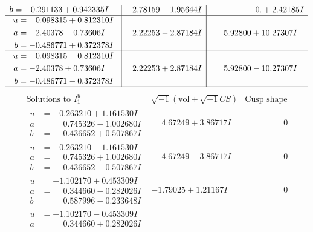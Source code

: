 \documentclass[1p]{elsarticle_modified}
\theoremstyle{definition}
\newcommand{\I}{\sqrt{-1}}
\begin{document}
$$\begin{array}{c|c|c}
\begin{aligned}
b &= -0.291133 + 0.942335 I\end{aligned}
 & -2.78159 - 1.95644 I & \phantom{-0.000000 -}0. + 2.42185 I \\ \hline\begin{aligned}
u &= \phantom{-}0.098315 + 0.812310 I \\
a &= -2.40378 - 0.73606 I \\
b &= -0.486771 + 0.372378 I\end{aligned}
 & \phantom{-}2.22253 - 2.87184 I & \phantom{-}5.92800 + 10.27307 I \\ \hline\begin{aligned}
u &= \phantom{-}0.098315 - 0.812310 I \\
a &= -2.40378 + 0.73606 I \\
b &= -0.486771 - 0.372378 I\end{aligned}
 & \phantom{-}2.22253 + 2.87184 I & \phantom{-}5.92800 - 10.27307 I\\
 \hline 
 \end{array}$$\newpage$$\begin{array}{c|c|c}  
\text{Solutions to }I^u_{1}& \I (\text{vol} + \sqrt{-1}CS) & \text{Cusp shape}\\
 \hline 
\begin{aligned}
u &= -0.263210 + 1.161530 I \\
a &= \phantom{-}0.745326 - 1.002680 I \\
b &= \phantom{-}0.436652 + 0.507867 I\end{aligned}
 & \phantom{-}4.67249 + 3.86717 I & \phantom{-0.000000 } 0 \\ \hline\begin{aligned}
u &= -0.263210 - 1.161530 I \\
a &= \phantom{-}0.745326 + 1.002680 I \\
b &= \phantom{-}0.436652 - 0.507867 I\end{aligned}
 & \phantom{-}4.67249 - 3.86717 I & \phantom{-0.000000 } 0 \\ \hline\begin{aligned}
u &= -1.102170 + 0.453309 I \\
a &= \phantom{-}0.344660 - 0.282026 I \\
b &= \phantom{-}0.587996 - 0.233648 I\end{aligned}
 & -1.79025 + 1.21167 I & \phantom{-0.000000 } 0 \\ \hline\begin{aligned}
u &= -1.102170 - 0.453309 I \\
a &= \phantom{-}0.344660 + 0.282026 I \\

\end{aligned}
\end{array}$$
\end{document}
